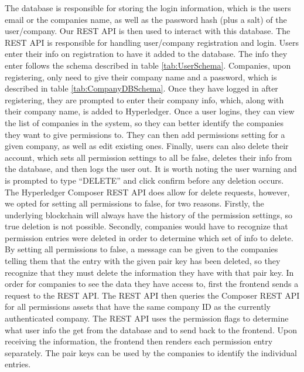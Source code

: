 \documentclass[11pt,journal]{IEEEtran}
\begin{document}
The database is responsible for storing the login information, which is the users email or the companies name, as well as the password hash (plus a salt) of the user/company. Our REST API is then used to interact with this database. The REST API is responsible for handling user/company registration and login. Users enter their info on registration to have it added to the database. The info they enter follows the schema described in table \ref{tab:UserSchema}. Companies, upon registering, only need to give their company name and a password, which is described in table \ref{tab:CompanyDBSchema}. Once they have logged in after registering, they are prompted to enter their company info, which, along with their company name, is added to Hyperledger. Once a user logins, they can view the list of companies in the system, so they can better identify the companies they want to give permissions to. They can then add permissions setting for a given company, as well as edit existing ones. Finally, users can also delete their account, which sets all permission settings to all be false, deletes their info from the database, and then logs the user out. It is worth noting the user warning and is prompted to type “DELETE” and click confirm before any deletion occurs. The Hyperledger Composer REST API does allow for delete requests, however, we opted for setting all permissions to false, for two reasons. Firstly, the underlying blockchain will always have the history of the permission settings, so true deletion is not possible. Secondly, companies would have to recognize that permission entries were deleted in order to determine which set of info to delete. By setting all permissions to false, a message can be given to the companies telling them that the entry with the given pair key has been deleted, so they recognize that they must delete the information they have with that pair key. In order for companies to see the data they have access to, first the frontend sends a request to the REST API. The REST API then queries the Composer REST API for all permissions assets that have the same company ID as the currently authenticated company. The REST API uses the permission flags to determine what user info the get from the database and to send back to the frontend. Upon receiving the information, the frontend then renders each permission entry separately. The pair keys can be used by the companies to identify the individual entries.  
\end{document}
